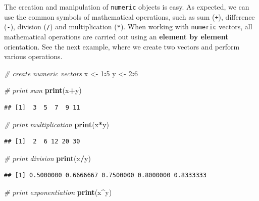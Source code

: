 \documentclass[11pt,]{book}
\newenvironment{Shaded}{\begin{snugshade}}{\end{snugshade}}
\newcommand{\KeywordTok}[1]{\textcolor[rgb]{0.27,0.27,0.27}{\textbf{#1}}}
\newcommand{\DecValTok}[1]{\textcolor[rgb]{0.06,0.06,0.06}{#1}}
\newcommand{\StringTok}[1]{\textcolor[rgb]{0.5,0.5,0.5}{#1}}
\newcommand{\CommentTok}[1]{\textcolor[rgb]{0.56,0.35,0.01}{\textit{#1}}}
\newcommand{\OperatorTok}[1]{\textcolor[rgb]{0.81,0.36,0.00}{\textbf{#1}}}
\newcommand{\NormalTok}[1]{#1}
\begin{document}
The creation and manipulation of \texttt{numeric} objects is easy. As
expected, we can use the common symbols of mathematical operations, such
as sum (\texttt{+}), difference (\texttt{-}), division (\texttt{/}) and
multiplication (\texttt{*}). When working with \texttt{numeric} vectors,
all mathematical operations are carried out using an \textbf{element by
element} orientation. See the next example, where we create two vectors
and perform various operations.

\begin{Shaded}
\begin{Highlighting}[]
\CommentTok{# create numeric vectors}
\NormalTok{x <-}\StringTok{ }\DecValTok{1}\OperatorTok{:}\DecValTok{5}
\NormalTok{y <-}\StringTok{ }\DecValTok{2}\OperatorTok{:}\DecValTok{6}

\CommentTok{# print sum}
\KeywordTok{print}\NormalTok{(x}\OperatorTok{+}\NormalTok{y)}
\end{Highlighting}
\end{Shaded}

\begin{verbatim}
## [1]  3  5  7  9 11
\end{verbatim}

\begin{Shaded}
\begin{Highlighting}[]
\CommentTok{# print multiplication}
\KeywordTok{print}\NormalTok{(x}\OperatorTok{*}\NormalTok{y)}
\end{Highlighting}
\end{Shaded}

\begin{verbatim}
## [1]  2  6 12 20 30
\end{verbatim}

\begin{Shaded}
\begin{Highlighting}[]
\CommentTok{# print division}
\KeywordTok{print}\NormalTok{(x}\OperatorTok{/}\NormalTok{y)}
\end{Highlighting}
\end{Shaded}

\begin{verbatim}
## [1] 0.5000000 0.6666667 0.7500000 0.8000000 0.8333333
\end{verbatim}

\begin{Shaded}
\begin{Highlighting}[]
\CommentTok{# print exponentiation}
\KeywordTok{print}\NormalTok{(x}\OperatorTok{^}\NormalTok{y)}
\end{Highlighting}
\end{Shaded}
\end{document}
